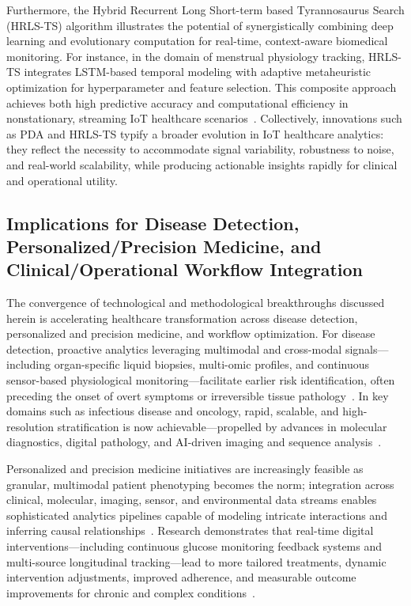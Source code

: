\documentclass[sigconf]{acmart}
\begin{document}
Furthermore, the Hybrid Recurrent Long Short-term based Tyrannosaurus Search (HRLS-TS) algorithm illustrates the potential of synergistically combining deep learning and evolutionary computation for real-time, context-aware biomedical monitoring. For instance, in the domain of menstrual physiology tracking, HRLS-TS integrates LSTM-based temporal modeling with adaptive metaheuristic optimization for hyperparameter and feature selection. This composite approach achieves both high predictive accuracy and computational efficiency in nonstationary, streaming IoT healthcare scenarios~\cite{ref107}. Collectively, innovations such as PDA and HRLS-TS typify a broader evolution in IoT healthcare analytics: they reflect the necessity to accommodate signal variability, robustness to noise, and real-world scalability, while producing actionable insights rapidly for clinical and operational utility.

\subsection{Implications for Disease Detection, Personalized/Precision Medicine, and Clinical/Operational Workflow Integration}

The convergence of technological and methodological breakthroughs discussed herein is accelerating healthcare transformation across disease detection, personalized and precision medicine, and workflow optimization. For disease detection, proactive analytics leveraging multimodal and cross-modal signals—including organ-specific liquid biopsies, multi-omic profiles, and continuous sensor-based physiological monitoring—facilitate earlier risk identification, often preceding the onset of overt symptoms or irreversible tissue pathology~\cite{ref21,ref51,ref63,ref82,ref94}. In key domains such as infectious disease and oncology, rapid, scalable, and high-resolution stratification is now achievable—propelled by advances in molecular diagnostics, digital pathology, and AI-driven imaging and sequence analysis~\cite{ref18,ref25,ref41,ref51,ref52,ref53,ref62,ref63,ref66,ref67,ref105}.

Personalized and precision medicine initiatives are increasingly feasible as granular, multimodal patient phenotyping becomes the norm; integration across clinical, molecular, imaging, sensor, and environmental data streams enables sophisticated analytics pipelines capable of modeling intricate interactions and inferring causal relationships~\cite{ref28,ref29,ref31,ref33,ref35,ref38,ref49,ref54,ref60,ref63,ref65,ref94,ref104}. Research demonstrates that real-time digital interventions—including continuous glucose monitoring feedback systems and multi-source longitudinal tracking—lead to more tailored treatments, dynamic intervention adjustments, improved adherence, and measurable outcome improvements for chronic and complex conditions~\cite{ref27,ref90,ref95,ref101}.
\end{document}
